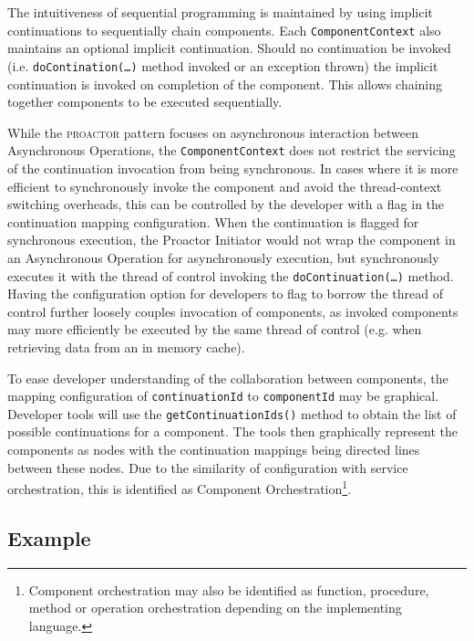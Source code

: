 \documentclass[prodmode]{style/acmlarge}
\begin{document}
The intuitiveness of sequential programming is maintained by using implicit
continuations \cite{continuations} to sequentially chain components.  Each
\texttt{ComponentContext} also maintains an optional implicit continuation. 
Should no continuation be invoked (i.e. \texttt{doContination(\ldots)} method
invoked or an exception thrown) the implicit continuation is invoked on
completion of the component.  This allows chaining together components to be
executed sequentially.

While the \textsc{proactor} pattern focuses on asynchronous interaction between
Asynchronous Operations, the \texttt{ComponentContext} does not restrict the
servicing of the continuation invocation from being synchronous.  In cases where
it is more efficient to synchronously invoke the component and avoid the
thread-context switching overheads, this can be controlled by the developer with
a flag in the continuation mapping configuration.  When the continuation is
flagged for synchronous execution, the Proactor Initiator would not wrap the
component in an Asynchronous Operation for asynchronously execution, but
synchronously executes it with the thread of control invoking the
\texttt{doContinuation(\ldots)} method.  Having the configuration option for developers
to flag to borrow the thread of control further loosely couples invocation of
components, as invoked components may more efficiently be executed by the same
thread of control (e.g. when retrieving data from an in memory cache).

To ease developer understanding of the collaboration between components, the
mapping configuration of \texttt{continuationId}  to \texttt{componentId} may be
graphical.  Developer tools will use the \texttt{getContinuationIds()} method to
obtain the list of possible continuations for a component.  The tools then
graphically represent the components as nodes with the continuation mappings
being directed lines between these nodes.  Due to the similarity of
configuration with service orchestration, this is identified as Component
Orchestration\footnote{Component orchestration may also be identified as
function, procedure, method or operation orchestration depending on the
implementing language.}.


\subsection{Example}
\end{document}
